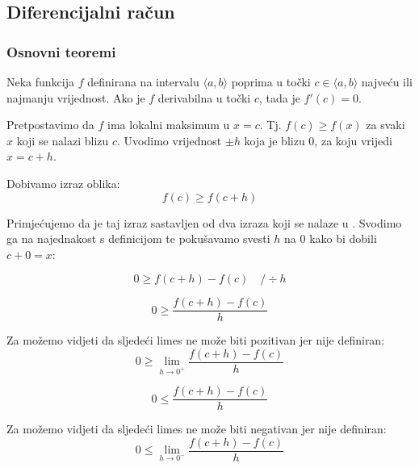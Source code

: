 \subsection{Diferencijalni račun}

\subsubsection{Osnovni teoremi}

\begin{theorem}
    Neka funkcija $f$ definirana na intervalu $\langle a,b \rangle$ poprima u
    točki $c\in\langle a,b \rangle$ najveću ili najmanju vrijednost. Ako je $f$
    derivabilna u točki $c$, tada je $f'(c)=0$.
\end{theorem}


Pretpostavimo da $f$ ima lokalni maksimum u $x=c$. Tj. $f(c)\geq f(x)$ za svaki
$x$ koji se nalazi blizu $c$.
Uvodimo vrijednost $\pm h$ koja je blizu $0$, za koju
vrijedi $x = c+h$.

Dobivamo izraz oblika:
$$
f(c)\geq f(c+h)
$$

Primjećujemo da je taj izraz sastavljen od dva izraza koji se nalaze u
.
Svodimo ga na najednakost s definicijom te pokušavamo svesti $h$ na $0$ kako bi
dobili $c+0=x$:

$$
0 \geq f(c+h) - f(c)\quad /\div h
$$

\begin{multicols}{2}
\begin{equation}
\label{eq:fermat_h_gt_zero}
0\geq\frac{f(c+h)-f(c)}{h}\tag{$h>0$}
\end{equation}

\noindent
Za  možemo vidjeti da sljedeći limes ne može
biti pozitivan jer nije definiran:
$$
    0\geq \lim_{h\to 0^+}\frac{f(c+h)-f(c)}{h}
$$

\newcolumn

\begin{equation}
\label{eq:fermat_h_lt_zero}
0\leq\frac{f(c+h)-f(c)}{h}\tag{$h<0$}
\end{equation}

\noindent
Za  možemo vidjeti da sljedeći limes ne može
biti negativan jer nije definiran:
$$
    0\leq \lim_{h\to 0^-}\frac{f(c+h)-f(c)}{h}
$$

\end{multicols}

